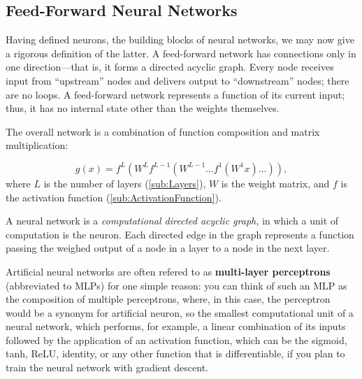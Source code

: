 \documentclass{tufte-handout}
\begin{document}
\subsection{Feed-Forward Neural Networks}%
  \label{sub:Feed-Forward Neural Networks}
  Having defined neurons, the building blocks of neural networks, we may now give a rigorous definition of the latter. A feed-forward network has connections only in one direction—that is, it forms a directed acyclic graph. Every node receives input from “upstream” nodes and delivers output to “downstream” nodes; there are no loops. A feed-forward network represents a function of its current input; thus, it has no internal state other than the weights themselves.\cite{book:AIModernApp}

The overall network is a combination of function composition and matrix multiplication:

  $$g(x) = f^L (W^Lf^{L-1}(W^{L-1} \hdots f^1(W^1x)\hdots)), $$
  where $L$ is the number of layers (\ref{sub:Layers}), $W$ is the weight matrix, and $f$ is the activation function (\ref{sub:ActivationFunction}).
 \begin{definition}
  A neural network is a \textit{computational directed acyclic graph,} in which a unit of computation is the neuron. Each directed edge in the graph represents a function passing the weighed output of a node in a layer to a node in the next layer.
 \end{definition} 

   Artificial neural networks are often refered to as \textbf{multi-layer perceptrons} (abbreviated to MLPs) for one simple reason: you can think of such an MLP as the composition of multiple perceptrons, where, in this case, the perceptron would be a synonym for artificial neuron, so the smallest computational unit of a neural network, which performs, for example, a linear combination of its inputs followed by the application of an activation function, which can be the sigmoid, tanh, ReLU, identity, or any other function that is differentiable, if you plan to train the neural network with gradient descent.
\end{document}
